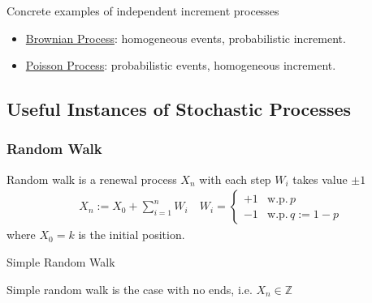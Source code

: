 \begin{point}
    Concrete examples of independent increment processes
\end{point}

\begin{itemize}[topsep=2pt,itemsep=0pt]
    \item \hyperlink{BrownianProcess}{Brownian Process}: homogeneous events, probabilistic increment.
    \item \hyperlink{PoissonProcess}{Poisson Process}: probabilistic events, homogeneous increment.
\end{itemize}









\subsection{Useful Instances of Stochastic Processes}

\subsubsection{Random Walk}
\hypertarget{RandomWalk}{}

Random walk is a renewal process $ X_n $ with each step $ W_i $ takes value $ \pm 1 $
\begin{align}
    X_n := X_0 +\sum_{i=1}^nW_i\quad W_i=\begin{cases}
        +1&\mathrm{w.p.}\, p\\
        -1&\mathrm{w.p.}\, q:=1-p  
    \end{cases}
\end{align}
where $ X_0=k $ is the initial position.

\begin{point}
    Simple Random Walk
\end{point}

Simple random walk is the case with no ends, i.e. $ X_n\in \mathbb{Z} $


